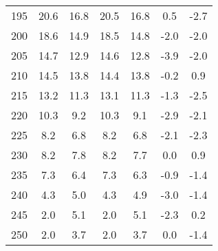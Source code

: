 \begin{longtable}{ccccccc}
    195                        & 20.6                     & 16.8                     & 20.5                       & 16.8                       & 0.5                               & -2.7                              \\
    200                        & 18.6                     & 14.9                     & 18.5                       & 14.8                       & -2.0                              & -2.0                              \\
    205                        & 14.7                     & 12.9                     & 14.6                       & 12.8                       & -3.9                              & -2.0                              \\
    210                        & 14.5                     & 13.8                     & 14.4                       & 13.8                       & -0.2                              & 0.9                               \\
    215                        & 13.2                     & 11.3                     & 13.1                       & 11.3                       & -1.3                              & -2.5                              \\
    220                        & 10.3                     & 9.2                      & 10.3                       & 9.1                        & -2.9                              & -2.1                              \\
    225                        & 8.2                      & 6.8                      & 8.2                        & 6.8                        & -2.1                              & -2.3                              \\
    230                        & 8.2                      & 7.8                      & 8.2                        & 7.7                        & 0.0                               & 0.9                               \\
    235                        & 7.3                      & 6.4                      & 7.3                        & 6.3                        & -0.9                              & -1.4                              \\
    240                        & 4.3                      & 5.0                      & 4.3                        & 4.9                        & -3.0                              & -1.4                              \\
    245                        & 2.0                      & 5.1                      & 2.0                        & 5.1                        & -2.3                              & 0.2                               \\
    250                        & 2.0                      & 3.7                      & 2.0                        & 3.7                        & 0.0                               & -1.4                              \\
\end{longtable}
